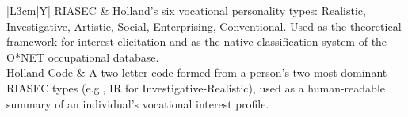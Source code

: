 \begin{table}[htbp]
\begin{tabularx}{\textwidth}{|L{3cm}|Y|}
\hline
RIASEC & Holland's six vocational personality types: Realistic, Investigative, Artistic, Social, Enterprising, Conventional. Used as the theoretical framework for interest elicitation and as the native classification system of the O*NET occupational database. \\
\hline
Holland Code & A two-letter code formed from a person's two most dominant RIASEC types (e.g., IR for Investigative-Realistic), used as a human-readable summary of an individual's vocational interest profile. \\
\hline
\end{tabularx}
\end{table}

